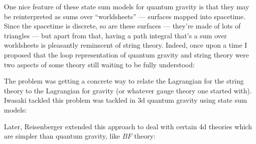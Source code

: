 \documentclass{article}
\def\tightlist{}
\renewcommand{\texttt}[1]{%
  \begingroup
  \ttfamily
  \begingroup\lccode`~=`/\lowercase{\endgroup\def~}{/\discretionary{}{}{}}%
  \begingroup\lccode`~=`[\lowercase{\endgroup\def~}{[\discretionary{}{}{}}%
  \begingroup\lccode`~=`.\lowercase{\endgroup\def~}{.\discretionary{}{}{}}%
  \catcode`/=\active\catcode`[=\active\catcode`.=\active
  \scantokens{#1\noexpand}%
  \endgroup
}
\begin{document}
\begin{itemize}
  One nice feature of these state sum models for quantum gravity is that
  they may be reinterpreted as sums over ``worldsheets'' --- surfaces
  mapped into spacetime. Since the spacetime is discrete, so are these
  surfaces --- they're made of lots of triangles --- but apart from
  that, having a path integral that's a sum over worldsheets is
  pleasantly reminscent of string theory. Indeed, once upon a time I
  proposed that the loop representation of quantum gravity and string
  theory were two aspects of some theory still waiting to be fully
  understood:


  The problem was getting a concrete way to relate the Lagrangian for
  the string theory to the Lagrangian for gravity (or whatever gauge
  theory one started with). Iwasaki tackled this problem was tackled in
  3d quantum gravity using state sum models:


  Later, Reisenberger extended this approach to deal with certain 4d
  theories which are simpler than quantum gravity, like \(BF\) theory:



\end{itemize}
\end{document}
